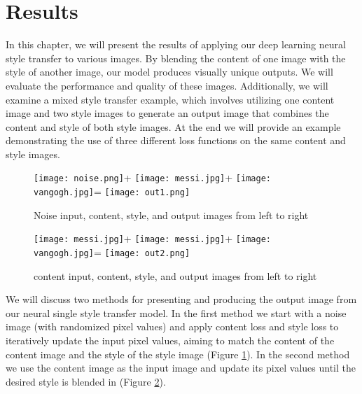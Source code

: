 \documentclass[12pt]{article}
\begin{document}
\section{Results}
In this chapter, we will present the results of applying our deep learning
neural style transfer to various images. By blending the content of one image
with the style of another image, our model produces visually unique outputs. We
will evaluate the performance and quality of these images. Additionally, we will
examine a mixed style transfer example, which involves utilizing one content
image and two style images to generate an output image that combines the content
and style of both style images. At the end we will provide an example
demonstrating the use of three different loss functions on the same content and
style images.

\begin{figure}[h]
    \centering
    \texttt{[image: noise.png]}\hspace{2mm}\large +
    \texttt{[image: messi.jpg]}\hspace{2mm}+
    \texttt{[image: vangogh.jpg]}\hspace{2mm}=
    \texttt{[image: out1.png]}
    \caption{Noise input, content, style, and output images from left to right}
    \label{fig:noise}
\end{figure}

\begin{figure}[h]
    \centering
    \texttt{[image: messi.jpg]}\hspace{2mm}\large +
    \texttt{[image: messi.jpg]}\hspace{2mm}+
    \texttt{[image: vangogh.jpg]}\hspace{2mm}=
    \texttt{[image: out2.png]}
    \caption{content input, content, style, and output images from left to right}
    \label{fig:messistart}
\end{figure}

We will discuss two methods for presenting and producing the output image from
our neural single style transfer model. In the first method we start with a
noise image (with randomized pixel values) and apply content loss and style loss
to iteratively update the input pixel values, aiming to match the content of the
content image and the style of the style image (Figure \ref{fig:noise}). In the
second method we use the content image as the input image and update its pixel
values until the desired style is blended in (Figure \ref{fig:messistart}).
\end{document}
